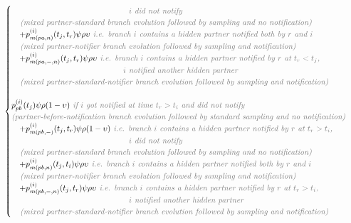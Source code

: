 \documentclass[10pt,letterpaper]{article}
\begin{document}
\begin{equation}
\begin{array}{ll}
\begin{cases}
\textit{\color{gray} ~~~~~~~~~~~~~~~~~~~~~~~~~~~~~~~~~~~~~~~~~$i$  did not notify}\\
 \textit{\color{gray} ~~~(mixed partner-standard branch evolution followed by sampling and no notification)}\\
 ~~~+p_{m(pa,n)}^{(i)}(t_j,t_r)\psi\rho\upsilon \textit{\color{gray} ~i.e. branch $i$ contains a hidden partner notified both by $r$ and $i$}\\
 \textit{\color{gray} ~~~(mixed partner-notifier branch evolution followed by sampling and notification)}
\\
~~~+p_{m(pa,-,n)}^{(i)}(t_j,t_r)\psi\rho\upsilon  \textit{\color{gray} ~i.e. branch $i$ contains a hidden partner notified by $r$ at $t_r < t_j$, }\\
\textit{\color{gray} ~~~~~~~~~~~~~~~~~~~~~~~~~~~~~~~~~~~~~~~$i$ notified another hidden partner}\\
 \textit{\color{gray} ~~~(mixed partner-standard-notifier branch evolution followed by sampling and notification)}
\\
\\
p_{pb}^{(i)}(t_j)\psi\rho(1 - \upsilon) \textit{\color{gray} ~if $i$ got notified at time $t_r > t_i$ and did not notify}\\
\textit{\color{gray} (partner-before-notification branch evolution followed by standard sampling and no notification)}
\\
~~~+p_{m(pb,-)}^{(i)}(t_j,t_r)\psi\rho(1-\upsilon) \textit{\color{gray} ~i.e. branch $i$ contains a hidden partner notified by $r$ at $t_r > t_i$, }\\
\textit{\color{gray} ~~~~~~~~~~~~~~~~~~~~~~~~~~~~~~~~~~~~~~~~~$i$  did not notify}\\
 \textit{\color{gray} ~~~(mixed partner-standard branch evolution followed by sampling and no notification)}\\
 ~~~+p_{m(pb,n)}^{(i)}(t_j,t_i)\psi\rho\upsilon \textit{\color{gray} ~i.e. branch $i$ contains a hidden partner notified both by $r$ and $i$}\\
 \textit{\color{gray} ~~~(mixed partner-notifier branch evolution followed by sampling and notification)}
\\
~~~+p_{m(pb,-,n)}^{(i)}(t_j,t_r)\psi\rho\upsilon  \textit{\color{gray} ~i.e. branch $i$ contains a hidden partner notified by $r$ at $t_r > t_i$, }\\
\textit{\color{gray} ~~~~~~~~~~~~~~~~~~~~~~~~~~~~~~~~~~~~~~~~~$i$ notified another hidden partner}\\
 \textit{\color{gray} ~~~(mixed partner-standard-notifier branch evolution followed by sampling and notification)}

\end{cases}
\end{array}
\end{equation}
\end{document}
